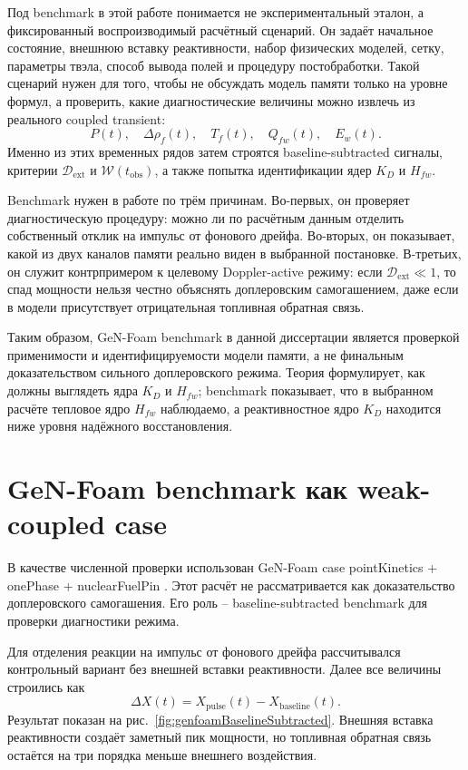 \documentclass[12pt]{article}
\begin{document}
Под benchmark в этой работе понимается не экспериментальный эталон, а фиксированный воспроизводимый расчётный сценарий. Он задаёт начальное состояние, внешнюю вставку реактивности, набор физических моделей, сетку, параметры твэла, способ вывода полей и процедуру постобработки. Такой сценарий нужен для того, чтобы не обсуждать модель памяти только на уровне формул, а проверить, какие диагностические величины можно извлечь из реального coupled transient:
\[
P(t),\quad
\Delta\rho_f(t),\quad
T_f(t),\quad
Q_{fw}(t),\quad
E_w(t).
\]
Именно из этих временных рядов затем строятся baseline-subtracted сигналы, критерии \(\mathcal D_{\mathrm{ext}}\) и \(\mathcal W(t_{\mathrm{obs}})\), а также попытка идентификации ядер \(K_D\) и \(H_{fw}\).

Benchmark нужен в работе по трём причинам. Во-первых, он проверяет диагностическую процедуру: можно ли по расчётным данным отделить собственный отклик на импульс от фонового дрейфа. Во-вторых, он показывает, какой из двух каналов памяти реально виден в выбранной постановке. В-третьих, он служит контрпримером к целевому Doppler-active режиму: если \(\mathcal D_{\mathrm{ext}}\ll1\), то спад мощности нельзя честно объяснять доплеровским самогашением, даже если в модели присутствует отрицательная топливная обратная связь.

Таким образом, GeN-Foam benchmark в данной диссертации является проверкой применимости и идентифицируемости модели памяти, а не финальным доказательством сильного доплеровского режима. Теория формулирует, как должны выглядеть ядра \(K_D\) и \(H_{fw}\); benchmark показывает, что в выбранном расчёте тепловое ядро \(H_{fw}\) наблюдаемо, а реактивностное ядро \(K_D\) находится ниже уровня надёжного восстановления.

\section{GeN-Foam benchmark как weak-coupled case}

В качестве численной проверки использован GeN-Foam case pointKinetics + onePhase + nuclearFuelPin \cite{GeNFoam2015,foamForNuclear2026}. Этот расчёт не рассматривается как доказательство доплеровского самогашения. Его роль -- baseline-subtracted benchmark для проверки диагностики режима.

Для отделения реакции на импульс от фонового дрейфа рассчитывался контрольный вариант без внешней вставки реактивности. Далее все величины строились как
\[
\Delta X(t)=X_{\mathrm{pulse}}(t)-X_{\mathrm{baseline}}(t).
\]
Результат показан на рис.~\ref{fig:genfoamBaselineSubtracted}. Внешняя вставка реактивности создаёт заметный пик мощности, но топливная обратная связь остаётся на три порядка меньше внешнего воздействия.
\end{document}

